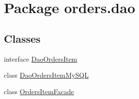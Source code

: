 \hypertarget{namespaceorders_1_1dao}{}\section{Package orders.\+dao}
\label{namespaceorders_1_1dao}
\subsection*{Classes}
\begin{DoxyCompactItemize}
\item 
interface \mbox{\hyperlink{interfaceorders_1_1dao_1_1_dao_orders_item}{Dao\+Orders\+Item}}
\item 
class \mbox{\hyperlink{classorders_1_1dao_1_1_dao_orders_item_my_s_q_l}{Dao\+Orders\+Item\+My\+S\+QL}}
\item 
class \mbox{\hyperlink{classorders_1_1dao_1_1_orders_item_facade}{Orders\+Item\+Facade}}
\end{DoxyCompactItemize}
